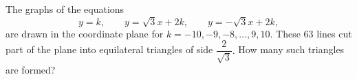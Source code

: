 The graphs of the equations \[ y=k, \qquad y=\sqrt{3}x+2k, \qquad y=-\sqrt{3}x+2k, \] are drawn in the coordinate plane for $k=-10,-9,-8,\ldots,9,10.$  These 63 lines cut part of the plane into equilateral triangles of side $\dfrac{2}{\sqrt{3}}.$  How many such triangles are formed?
